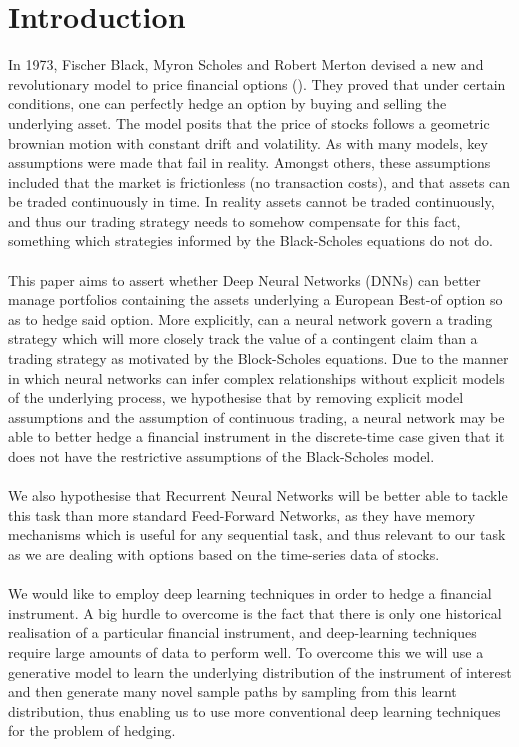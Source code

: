\documentclass{article}
\theoremstyle{definition}
\begin{document}
\section{Introduction}
In 1973, Fischer Black, Myron Scholes and Robert Merton devised a new and revolutionary model to price financial options (\cite{black1973pricing}). They proved that under certain conditions, one can perfectly hedge an option by buying and selling the underlying asset. The model posits that the price of stocks follows a geometric brownian motion with constant drift and volatility. As with many models, key assumptions were made that fail in reality. Amongst others, these assumptions included that the market is frictionless (no transaction costs), and that assets can be traded continuously in time. In reality assets cannot be traded continuously, and thus our trading strategy needs to somehow compensate for this fact, something which strategies informed by the Black-Scholes equations do not do.
\\\\
This paper aims to assert whether Deep Neural Networks (DNNs) can better manage portfolios containing the assets underlying a European Best-of option so as to hedge said option. More explicitly, can a neural network govern a trading strategy which will more closely track the value of a contingent claim than a trading strategy as motivated by the Block-Scholes equations. Due to the manner in which neural networks can infer complex relationships without explicit models of the underlying process, we hypothesise that by removing explicit model assumptions and the assumption of continuous trading, a neural network may be able to better hedge a financial instrument in the discrete-time case given that it does not have the restrictive assumptions of the Black-Scholes model.
\\\\
We also hypothesise that Recurrent Neural Networks will be better able to tackle this task than more standard Feed-Forward Networks, as they have memory mechanisms which is useful for any sequential task, and thus relevant to our task as we are dealing with options based on the time-series data of stocks.
\\\\
We would like to employ deep learning techniques in order to hedge a financial instrument. A big hurdle to overcome is the fact that there is only one historical realisation of a particular financial instrument, and deep-learning techniques require large amounts of data to perform well. To overcome this we will use a generative model to learn the underlying distribution of the instrument of interest and then generate many novel sample paths by sampling from this learnt distribution, thus enabling us to use more conventional deep learning techniques for the problem of hedging.
\end{document}

